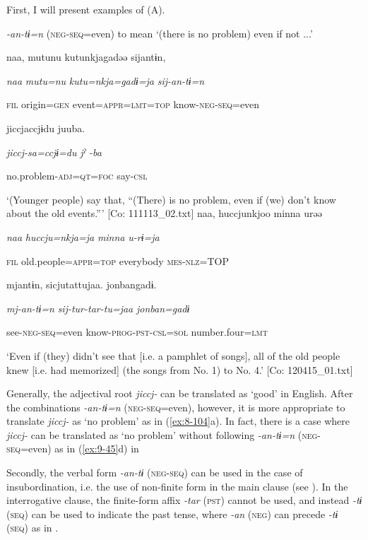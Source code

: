 First, I will present examples of (A).

\ea\label{ex:8-104}
  \textit{{}-an-tɨ=n} (\textsc{neg}-\textsc{seq}=even) to mean ‘(there is no problem) even if not ...’

\ea {\TM}
\glll  naa,  mutunu  kutunkjagadəə  sijantɨn,

      \textit{naa}  \textit{mutu=nu}  \textit{kutu=nkja=gadɨ=ja}  \textit{sij-an-tɨ=n}

      \textsc{fil}  origin=\textsc{gen}  event=\textsc{appr}=\textsc{lmt}=\textsc{top}  know-\textsc{neg}-\textsc{seq}=even

      jiccjaccjɨdu  juuba.

      \textit{jiccj-sa=ccjɨ=du}  \textit{jˀ} \textit{-ba}

      no.problem-\textsc{adj}=\textsc{qt}=\textsc{foc}  say-\textsc{csl}

\glt ‘(Younger people) say that, “(There) is no problem, even if (we) don’t know about the old events.”’ [Co: 111113\_02.txt]
\ex {\TM}
\glll  naa,  huccjunkjoo  minna  urəə

      \textit{naa}  \textit{huccju=nkja=ja}  \textit{minna}  \textit{u-rɨ=ja}

      \textsc{fil}  old.people=\textsc{appr}=\textsc{top}  everybody  \textsc{mes}-\textsc{nlz}=TOP

      mjantɨn,  sicjutattujaa.  {\textbar}jonban{\textbar}gadɨ.

      \textit{mj-an-tɨ=n}  \textit{sij-tur-tar-tu=jaa}  \textit{jonban=gadɨ}

      see-\textsc{neg}-\textsc{seq}=even  know-\textsc{prog}-\textsc{pst}-\textsc{csl}=\textsc{sol}  number.four=\textsc{lmt}

\glt ‘Even if (they) didn’t see that [i.e. a pamphlet of songs], all of the old people knew [i.e. had memorized] (the songs from No. 1) to No. 4.’ [Co: 120415\_01.txt]
\z

Generally, the adjectival root \textit{jiccj-} can be translated as ‘good’ in English. After the combinations \textit{{}-an-tɨ=n} (\textsc{neg}-\textsc{seq}=even), however, it is more appropriate to translate \textit{jiccj-} as ‘no problem’ as in (\ref{ex:8-104}a). In fact, there is a case where \textit{jiccj-} can be translated as ‘no problem’ without following \textit{{}-an-tɨ=n} (\textsc{neg}-\textsc{seq}=even) as in (\ref{ex:9-45}d) in 

  Secondly, the verbal form \textit{{}-an-tɨ} (\textsc{neg}-\textsc{seq}) can be used in the case of insubordination, i.e. the use of non-finite form in the main clause (see ). In the interrogative clause, the finite-form affix \textit{{}-tar} (\textsc{pst}) cannot be used, and instead \textit{{}-tɨ} (\textsc{seq}) can be used to indicate the past tense, where \textit{{}-an} (\textsc{neg}) can precede \textit{{}-tɨ} (\textsc{seq}) as in .

